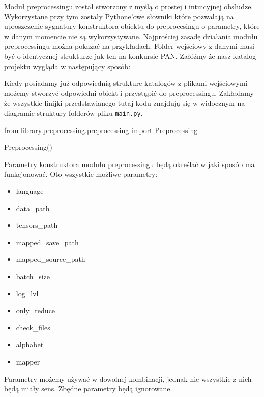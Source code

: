 Moduł preprocessingu został stworzony z myślą o prostej i intuicyjnej obsłudze. Wykorzystane przy
tym zostały Pythone'owe słowniki które pozwalają na uproszczenie sygnatury konstruktora obiektu do preprocesingu
 o parametry, które w danym momencie nie są wykorzystywane. Najprościej zasadę działania modułu preprocessingu można 
pokazać na przykładach. Folder wejściowy z danymi musi być o identycznej strukturze jak ten na 
konkursie PAN.
Załóżmy że nasz katalog projektu wygląda w następujący sposób:


\myspace
{}
\myspace

Kiedy posiadamy już odpowiednią strukture katalogów z plikami wejściowymi możemy stworzyć 
odpowiedni obiekt i przystąpić do preprocessingu. Zakładamy że wszystkie linijki przedstawianego 
tutaj kodu znajdują się w widocznym na diagramie struktury folderów pliku \texttt{main.py}.

\begin{python}
from library.preprocessing.preprocessing import Preprocessing

Preprocessing()

\end{python}

Parametry konstruktora modułu preprocessingu będą określać w jaki sposób ma funkcjonować. 
Oto wszystkie możliwe parametry:
\begin{itemize}
	\item language
	\item data\_path
	\item tensors\_path
	\item mapped\_save\_path
	\item mapped\_source\_path
	\item batch\_size
	\item log\_lvl
	\item only\_reduce
	\item check\_files
	\item alphabet
	\item mapper
\end{itemize}

Parametry możemy używać w dowolnej kombinacji, jednak nie wszystkie z nich będą miały sens. Zbędne
parametry będą ignorowane.

